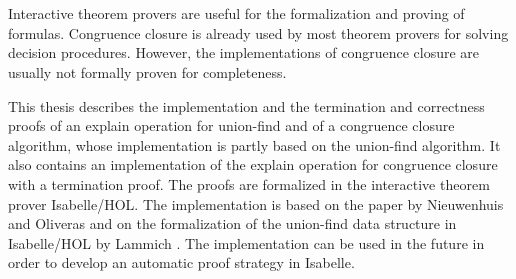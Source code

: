 \chapter{\abstractname}

Interactive theorem provers are useful for the formalization and proving of formulas. Congruence closure is already used by most theorem provers for solving decision procedures. However, the implementations of congruence closure are usually not formally proven for completeness.

This thesis describes the implementation and the termination and correctness proofs  of an explain operation for union-find and of a congruence closure algorithm, whose implementation is partly based on the union-find algorithm. It also contains an implementation of the explain operation for congruence closure with a termination proof. The proofs are formalized in the interactive theorem prover Isabelle/HOL. The implementation is based on the paper by Nieuwenhuis and Oliveras \cite{Nieuwenhuis} and on the formalization of the union-find data structure in Isabelle/HOL by Lammich \cite{unionfind-isabelle}. The implementation can be used in the future in order to develop an automatic proof strategy in Isabelle.